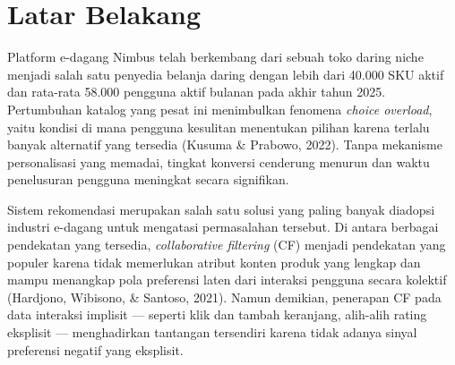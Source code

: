 \section{Latar Belakang}
Platform e-dagang Nimbus telah berkembang dari sebuah toko daring niche
menjadi salah satu penyedia belanja daring dengan lebih dari 40.000 SKU
aktif dan rata-rata 58.000 pengguna aktif bulanan pada akhir tahun 2025.
Pertumbuhan katalog yang pesat ini menimbulkan fenomena \emph{choice
overload}, yaitu kondisi di mana pengguna kesulitan menentukan pilihan
karena terlalu banyak alternatif yang tersedia (Kusuma \& Prabowo, 2022).
Tanpa mekanisme personalisasi yang memadai, tingkat konversi cenderung
menurun dan waktu penelusuran pengguna meningkat secara signifikan.

Sistem rekomendasi merupakan salah satu solusi yang paling banyak diadopsi
industri e-dagang untuk mengatasi permasalahan tersebut. Di antara berbagai
pendekatan yang tersedia, \emph{collaborative filtering} (CF) menjadi
pendekatan yang populer karena tidak memerlukan atribut konten produk yang
lengkap dan mampu menangkap pola preferensi laten dari interaksi pengguna
secara kolektif (Hardjono, Wibisono, \& Santoso, 2021). Namun demikian,
penerapan CF pada data interaksi implisit --- seperti klik dan tambah
keranjang, alih-alih rating eksplisit --- menghadirkan tantangan tersendiri
karena tidak adanya sinyal preferensi negatif yang eksplisit.
